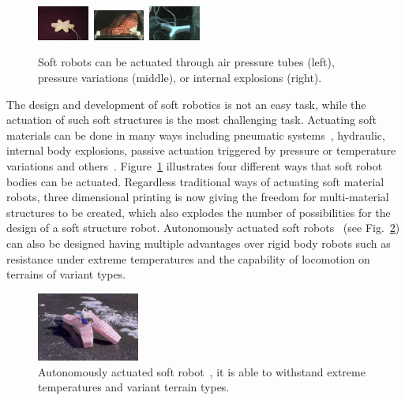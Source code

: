 \documentclass{sig-alternate}
\begin{document}
\begin{figure}[h!]
\centering
\includegraphics[width=0.15\textwidth,height=0.09\textheight]{../Figures/Misc/soft_robotics_figure.png}\		
\includegraphics[width=0.15\textwidth,height=0.09\textheight]{../Figures/Misc/hillerPressureChamber.png}\	
\includegraphics[width=0.15\textwidth,height=0.09\textheight]{../Figures/Misc/ExplodingRobot.jpg}\\
\caption{Soft robots can be actuated through air pressure tubes (left), pressure variations (middle), or internal explosions (right).}
\label{fig:softRobotsActuation}
\end{figure}

The design and development of soft robotics is not an easy task, while the actuation of such soft structures is the most challenging task. Actuating soft materials can be done in many ways including pneumatic systems~\cite{ilievski2011soft, shepherd2011multigait}, hydraulic, internal body explosions, passive actuation triggered by pressure or temperature variations and others~\cite{laschi2012soft, seok2010peristaltic}. Figure~\ref{fig:softRobotsActuation} illustrates four different ways that soft robot bodies can be actuated. Regardless traditional ways of actuating soft material robots, three dimensional printing is now giving the freedom for multi-material structures to be created, which also explodes the number of possibilities for the design of a soft structure robot. Autonomously actuated soft robots~\cite{tolleyresilient} (see Fig.~\ref{fig:softbot}) can also be designed having multiple advantages over rigid body robots such as resistance under extreme temperatures and the capability of locomotion on terrains of variant types.

\begin{figure}[b!]
\centering
\includegraphics[width=0.3\textwidth]{../Figures/Misc/softbot.jpg}
\caption{Autonomously actuated soft robot~\cite{tolleyresilient}, it is able to withstand extreme temperatures and variant terrain types.}
\label{fig:softbot}
\end{figure}
\end{document}
